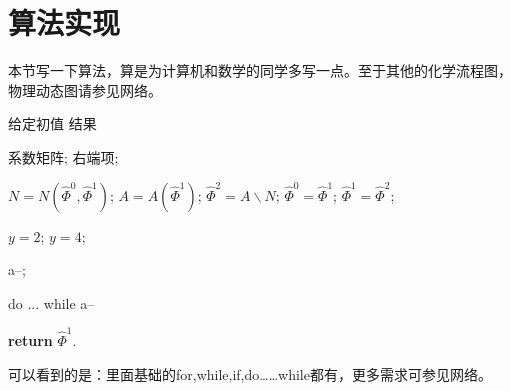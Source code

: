 \documentclass[10pt,a4paper]{article}
\begin{document}
    \newpage
    \section{算法实现}
    本节写一下算法，算是为计算机和数学的同学多写一点。至于其他的化学流程图，物理动态图请参见网络。

    \begin{algorithm}[!ht]
        \renewcommand{\algorithmicrequire}{\textbf{输入：}}
        \renewcommand{\algorithmicensure}{\textbf{输出：}}
        \caption{算法的名称}
        \label{power0}
        \begin{algorithmic}[1] %
            \REQUIRE  给定初值%
            \ENSURE 结果%
            
            \STATE 系数矩阵;
            \STATE 右端项; 
            
                \STATE $N=N(\widehat{\varPhi}^0,\widehat{\varPhi}^1)$;
                \STATE $A=A(\widehat{\varPhi}^1)$;
                \STATE $\widehat{\varPhi}^2=A\backslash N$;
                \STATE $\widehat{\varPhi}^0=\widehat{\varPhi}^1$;
                \STATE $\widehat{\varPhi}^1=\widehat{\varPhi}^2$;
            \ENDFOR
            
                \STATE $y = 2$;
            \ELSE
                \STATE $y = 4$;
            \ENDIF
            
                \STATE a--;
            \ENDWHILE
            
             do ... while
            \REPEAT
                \STATE a--
            
            \STATE \textbf{return} $\widehat{\varPhi}^1$.
        \end{algorithmic}
    \end{algorithm}

    可以看到的是：里面基础的for,while,if,do……while都有，更多需求可参见网络。
    
\end{document}
